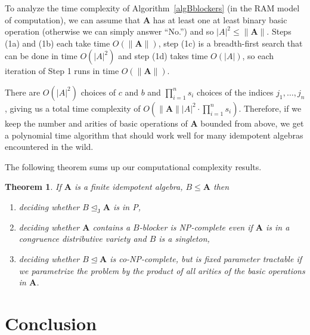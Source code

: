 \documentclass{amsart}
\theoremstyle{plain}
\newtheorem{theorem}{Theorem}
\theoremstyle{definition}
\begin{document}
To analyze the time complexity of Algorithm~\ref{algBblockers} (in the RAM
model of computation),
we can assume that ${{\mathbf{A}}}$ has at least one at least binary basic operation (otherwise we can simply answer ``No.'') and so $|A|^2\leq \|{{\mathbf{A}}}\|$.
Steps (1a) and (1b) each take time $O(\|{{\mathbf{A}}}\|)$, step (1c) is a breadth-first
search that can be done in time $O(|A|^2)$ and step (1d) takes time $O(|A|)$,
so each iteration of Step 1 runs in time $O(\|{{\mathbf{A}}}\|)$.  

There are $O(|A|^2)$ choices of $c$ and $b$ and $\prod_{i=1}^n s_i$ choices of
the indices $j_1,\dots,j_n$, giving us a total time complexity of
$O(\|{{\mathbf{A}}}\||A|^2\cdot \prod_{i=1}^n s_i)$. Therefore, if we keep the number
and arities of basic operations of ${{\mathbf{A}}}$ bounded from above, we get a
polynomial time algorithm that should work well for many idempotent algebras
encountered in the wild.

The following theorem sums up our computational complexity results.

\begin{theorem}
  If ${{\mathbf{A}}}$ is a finite idempotent algebra, $B\leq {{\mathbf{A}}}$ then
  \begin{enumerate}
    \item deciding whether $B\operatorname{\trianglelefteq_J} {{\mathbf{A}}}$ is in {{\textsf{P}}},
    \item deciding whether ${{\mathbf{A}}}$ contains a $B$-blocker is {{\textsf{NP}}}-complete even
      if ${{\mathbf{A}}}$ is in a congruence distributive variety and $B$ is a singleton,
    \item deciding whether $B\operatorname{\trianglelefteq} {{\mathbf{A}}}$ is co-{{\textsf{NP}}}-complete, but is fixed
      parameter tractable if we parametrize the problem by the product of all arities
      of the basic operations in ${{\mathbf{A}}}$.
  \end{enumerate}
\end{theorem}

\section{Conclusion}
\end{document}
